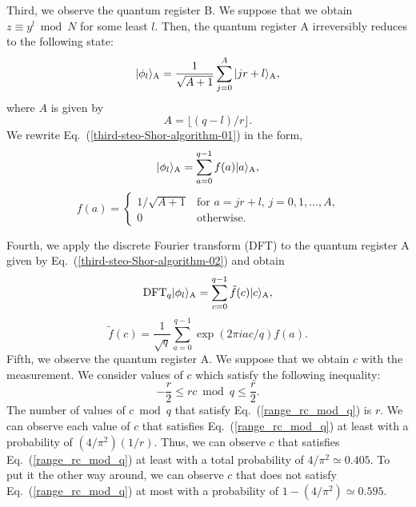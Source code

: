 \documentclass[12pt]{article}
\begin{document}
Third,
we observe the quantum register B.
We suppose that we obtain
$z\equiv y^{l} \bmod N$ for some least $l$.
Then,
the quantum register A irreversibly reduces to the following state:
\begin{equation}
|\phi_{l}\rangle_{\mbox{\scriptsize A}}
=
\frac{1}{\sqrt{A+1}}
\sum_{j=0}^{A}
|jr+l\rangle_{\mbox{\scriptsize A}},
\label{third-steo-Shor-algorithm-01}
\end{equation}
where $A$ is given by
\begin{equation}
A=\lfloor (q-l)/r\rfloor.
\label{definition-A}
\end{equation}
We rewrite Eq.~(\ref{third-steo-Shor-algorithm-01}) in the form,
\begin{equation}
|\phi_{l}\rangle_{\mbox{\scriptsize A}}
=
\sum_{a=0}^{q-1}
f(a)|a\rangle_{\mbox{\scriptsize A}},
\label{third-steo-Shor-algorithm-02}
\end{equation}
\begin{equation}
f(a)
=
\left\{
\begin{array}{ll}
1/\sqrt{A+1} & \mbox{for $a=jr+l$, $j=0,1,...,A$,} \\
0 & \mbox{otherwise.}
\end{array}
\right.
\label{definition-f(a)}
\end{equation}

Fourth,
we apply the discrete Fourier transform (DFT) to the quantum register A given by Eq.~(\ref{third-steo-Shor-algorithm-02}) and obtain
\begin{equation}
\mbox{DFT}_{q}|\phi_{l}\rangle_{\mbox{\scriptsize A}}
=
\sum_{c=0}^{q-1}
\tilde{f}(c)|c\rangle_{\mbox{\scriptsize A}},
\label{DFT-state-Shor}
\end{equation}
\begin{equation}
\tilde{f}(c)
=
\frac{1}{\sqrt{q}}
\sum_{a=0}^{q-1}
\exp(2\pi i ac/q)f(a).
\label{Shor-amplitude}
\end{equation}
Fifth,
we observe the quantum register A.
We suppose that we obtain $c$ with the measurement.
We consider values of $c$ which satisfy the following inequality:
\begin{equation}
-\frac{r}{2}
\leq
rc \bmod q
\leq
\frac{r}{2}.
\label{range_rc_mod_q}
\end{equation}
The number of values of $c \bmod q$ that satisfy Eq.~(\ref{range_rc_mod_q}) is $r$.
We can observe each value of $c$ that satisfies Eq.~(\ref{range_rc_mod_q}) at least with a probability of $(4/\pi^{2})(1/r)$.
Thus,
we can observe $c$ that satisfies Eq.~(\ref{range_rc_mod_q}) at least with a total probability of $4/\pi^{2}\simeq 0.405$.
To put it the other way around,
we can observe $c$ that does not satisfy Eq.~(\ref{range_rc_mod_q}) at most with a probability of $1-(4/\pi^{2})\simeq 0.595$.
\end{document}
